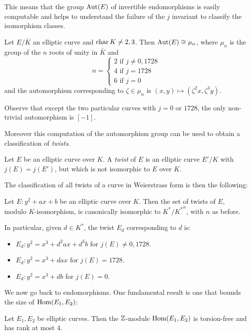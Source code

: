 This means that the group $\operatorname{Aut}(E)$ of invertible endomorphisms is easily computable and helps to understand the failure of the $j$ invariant to classify the isomorphism classes.

\begin{theorem}
    Let $E/\bar K$ an elliptic curve and $\operatorname{char} K\neq 2,3$. Then $\operatorname{Aut}(E)\cong\mu_n$, where $\mu_n$ is the group of the $n$ roots of unity in $\bar K$ and 
    $$n=\begin{cases}2\text{ if } j\neq0,1728\\ 4 \text{ if } j=1728\\ 6 \text{ if } j=0\end{cases}$$
    and the automorphism corresponding to $\zeta\in\mu_n$ is $(x,y)\mapsto(\zeta^2x,\zeta^3y)$.
\end{theorem}

Observe that except the two particular curves with $j=0$ or $1728$, the only non-trivial automorphism is $[-1]$.

Moreover this computation of the automorphism group can be used to obtain a classification of \emph{twists}.

\begin{definition}
    Let $E$ be an elliptic curve over $K$. A \emph{twist} of $E$ is an elliptic curve $E'/K$ with $j(E)=j(E')$, but which is not isomorphic to $E$ over $K$.
\end{definition}

The classification of all twists of a curve in Weierstrass form is then the following:
\begin{proposition}
    Let $E:y^2+ax+b$ be an elliptic curve over $K$. Then the set of twists of $E$, modulo $K$-isomorphism, is canonically isomorphic to $K^\ast/{K^\ast}^n$, with $n$ as before.
    
    In particular, given $d\in K^\ast$, the twist $E_d$ corresponding to $d$ is:
    \begin{itemize}
        \item $E_d: y^2=x^3+d^2ax+d^3b$ for $j(E)\neq0,1728$.
        \item $E_d: y^2=x^3+dax$ for $j(E)=1728$.
        \item $E_d: y^2=x^3+db$ for $j(E)=0$.
    \end{itemize}
\end{proposition}

We now go back to endomorphisms. One fundamental result is one that bounds the size of $\operatorname{Hom}(E_1,E_2)$:
\begin{proposition}
    Let $E_1,E_2$ be elliptic curves. Then the $\mathbb{Z}$-module $\operatorname{Hom}(E_1,E_2)$ is torsion-free and has rank at most $4$.
\end{proposition}

